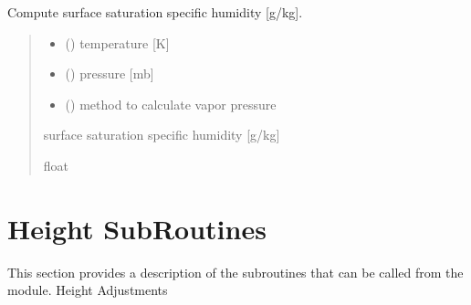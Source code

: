 \documentclass[letterpaper,10pt,english]{sphinxmanual}
\begin{document}
\begin{fulllineitems}
\label{\detokenize{users_guide:AirSeaFluxCode.hum_subs.qsat_sea}}
\pysigstartsignatures
\pysiglinewithargsret
{}
{\sphinxparamcomma {}\sphinxparamcomma {}}
{}
\pysigstopsignatures
\sphinxAtStartPar
Compute surface saturation specific humidity {[}g/kg{]}.
\begin{quote}\begin{description}
\begin{itemize}
\item {}
\sphinxAtStartPar
{} () \textendash{} temperature {[}K{]}

\item {}
\sphinxAtStartPar
{} () \textendash{} pressure {[}mb{]}

\item {}
\sphinxAtStartPar
{} () \textendash{} method to calculate vapor pressure

\end{itemize}

\sphinxAtStartPar
{} \textendash{} surface saturation specific humidity {[}g/kg{]}

\sphinxAtStartPar
float

\end{description}\end{quote}

\end{fulllineitems}



\section{Height Sub\sphinxhyphen{}Routines}
\label{\detokenize{users_guide:height-sub-routines}}
\sphinxAtStartPar
This section provides a description of the sub\sphinxhyphen{}routines that can be called from the
 module.
\label{\detokenize{users_guide:module-AirSeaFluxCode.height_subs}}
\sphinxAtStartPar
Height Adjustments
\end{document}
